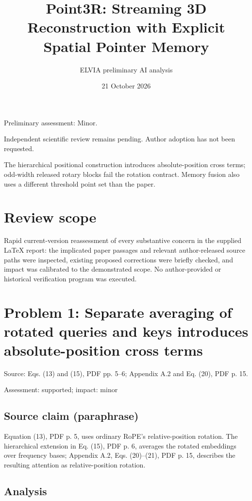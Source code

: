\documentclass[11pt]{article}
\begin{document}
\title{Point3R: Streaming 3D Reconstruction with Explicit Spatial Pointer Memory}

\author{ELVIA preliminary AI analysis}\date{21 October 2026}\maketitle

Preliminary assessment: Minor.\par

Independent scientific review remains pending. Author adoption has not been requested.

The hierarchical positional construction introduces absolute-position cross terms; odd-width released rotary blocks fail the rotation contract. Memory fusion also uses a different threshold point set than the paper.

\section*{Review scope}

Rapid current-version reassessment of every substantive concern in the supplied LaTeX report: the implicated paper passages and relevant author-released source paths were inspected, existing proposed corrections were briefly checked, and impact was calibrated to the demonstrated scope. No author-provided or historical verification program was executed.

\section*{Problem 1: Separate averaging of rotated queries and keys introduces absolute-position cross terms}

Source: Eqs. (13) and (15), PDF pp. 5–6; Appendix A.2 and Eq. (20), PDF p. 15.

Assessment: supported; impact: minor

\subsection*{Source claim (paraphrase)}

Equation (13), PDF p. 5, uses ordinary RoPE's relative-position rotation. The hierarchical extension in Eq. (15), PDF p. 6, averages the rotated embeddings over frequency bases; Appendix A.2, Eqs. (20)–(21), PDF p. 15, describes the resulting attention as relative-position rotation.

\subsection*{Analysis}
\end{document}
